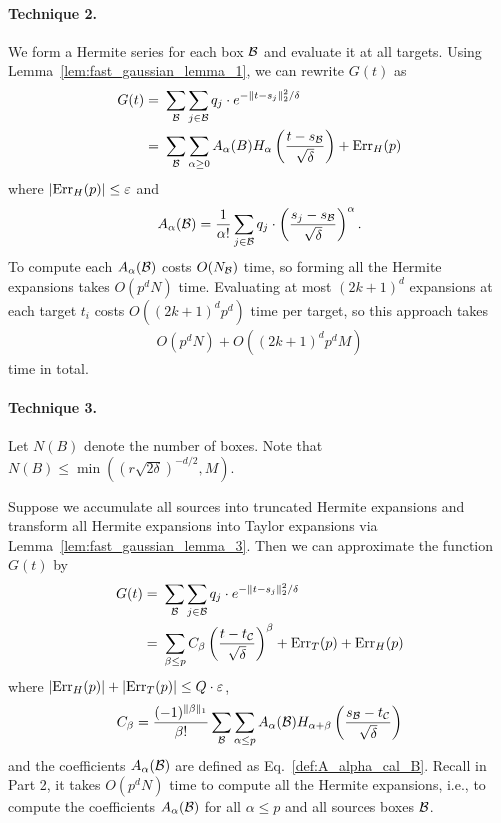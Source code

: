 \paragraph*{Technique 2.} We form a Hermite series for each box ${\cal B}$ and evaluate it at all targets. Using Lemma~\ref{lem:fast_gaussian_lemma_1}, we can rewrite $G(t)$ as
\begin{align*}
G(t) = & ~ \sum_{ {\cal B} } \sum_{ j \in {\cal B} } q_j \cdot e^{ - \| t - s_j \|_2^2 / \delta } \\ 
= & ~ \sum_{ {\cal B} } \sum_{ \alpha \geq 0 } A_{\alpha} (B) H_{\alpha} \left( \frac{ t - s_{\cal B} }{ \sqrt{\delta} } \right) + \mathrm{Err}_H(p)
\end{align*}
where $|\mathrm{Err}_H(p)| \leq \varepsilon$ and
\begin{align}\label{def:A_alpha_cal_B}
A_{\alpha}  ( {\cal B} ) = \frac{1}{\alpha !} \sum_{j \in {\cal B}} q_j \cdot \left( \frac{ s_j - s_{\cal B} }{ \sqrt{\delta} } \right)^{\alpha}.
\end{align}
To compute each $A_{\alpha}( {\cal B})$ costs $O(N_{\cal B})$ time, so forming all the Hermite expansions takes $O(p^d N)$ time. Evaluating at most $(2k + 1)^d$ expansions at each target $t_i$ costs $O( (2k+1)^d p^d )$ time per target, so this approach takes
\begin{align*}
O(p^d N) + O(  (2k+1)^d p^d M )
\end{align*}
time in total.

\paragraph*{Technique 3.} Let $N(B)$ denote the number of boxes. Note that $N(B) \leq \min ( ( r \sqrt{2\delta} )^{-d/2} , M )$.

 Suppose we accumulate all sources into truncated Hermite expansions and transform all Hermite expansions into Taylor expansions via Lemma~\ref{lem:fast_gaussian_lemma_3}. Then we can approximate the function $G(t)$ by
\begin{align*}
G(t) = & ~ \sum_{{\cal B}} \sum_{j \in {\cal B}} q_j \cdot e^{ - \| t - s_j \|_2^2 / \delta } \\
= & ~ \sum_{\beta \leq p} C_{\beta} \left( \frac{ t - t_{\cal C} }{ \sqrt{\delta} } \right)^{\beta} + \mathrm{Err}_T(p) + \mathrm{Err}_H(p)
\end{align*}
where $|\mathrm{Err}_H(p)| + |\mathrm{Err}_T(p)| \leq Q \cdot \varepsilon$,
\begin{align*}
C_{\beta} = \frac{ (-1)^{\| \beta \|_1 } }{ \beta ! } \sum_{{\cal B}} \sum_{\alpha \leq p} A_{\alpha} ({\cal B}) H_{\alpha + \beta} \left( \frac{ s_{ {\cal B } } - t_{ {\cal C} } }{ \sqrt{\delta} } \right)
\end{align*}
and the coefficients $A_{\alpha}({\cal B})$ are defined as Eq.~\eqref{def:A_alpha_cal_B}. Recall in Part 2, it takes $O(p^d N)$ time to compute all the Hermite expansions, i.e., to compute the coefficients $A_{\alpha} ({\cal B})$ for all $\alpha \leq p$ and all sources boxes ${\cal B}$.

